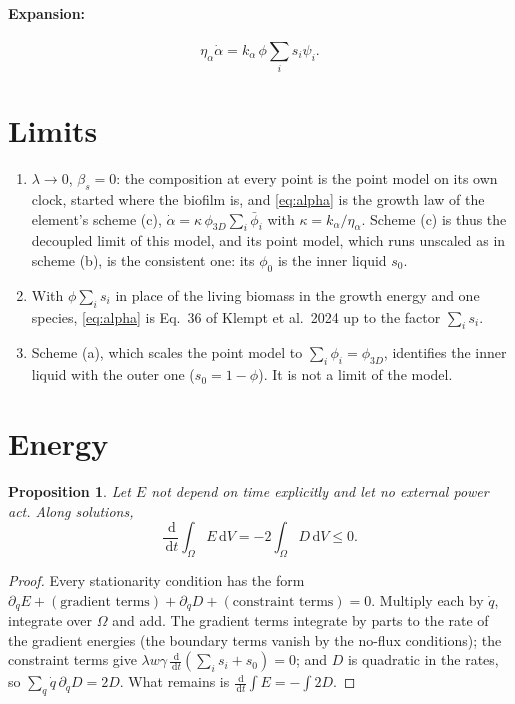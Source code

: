 \documentclass[11pt,a4paper]{article}
\newtheorem{proposition}{Proposition}
\newcommand{\dd}{\,\mathrm{d}}
\begin{document}
\paragraph{Expansion:}
\begin{equation}
\eta_\alpha\dot\alpha=k_\alpha\,\phi\sum_is_i\psi_i .
\label{eq:alpha}
\end{equation}

\section{Limits}

\begin{enumerate}
\item $\lambda\to0$, $\beta_s=0$: the composition at every point is the point model on
  its own clock, started where the biofilm is, and \eqref{eq:alpha} is the growth law of
  the element's scheme (c), $\dot\alpha=\kappa\,\phi_{3D}\sum_i\bar\phi_i$ with
  $\kappa=k_\alpha/\eta_\alpha$. Scheme (c) is thus the decoupled limit of this model,
  and its point model, which runs unscaled as in scheme (b), is the consistent one: its
  $\phi_0$ is the inner liquid $s_0$.
\item With $\phi\sum_is_i$ in place of the living biomass in the growth energy and one
  species, \eqref{eq:alpha} is Eq.~36 of Klempt et al.\ 2024 up to the factor $\sum_is_i$.
\item Scheme (a), which scales the point model to $\sum_i\phi_i=\phi_{3D}$, identifies
  the inner liquid with the outer one ($s_0=1-\phi$). It is not a limit of the model.
\end{enumerate}

\section{Energy}

\begin{proposition}
Let $E$ not depend on time explicitly and let no external power act. Along solutions,
\[\frac{\dd}{\dd t}\int_\Omega E\dd V=-2\int_\Omega D\dd V\le0 .\]
\end{proposition}
\begin{proof}
Every stationarity condition has the form $\partial_qE+(\text{gradient terms})
+\partial_{\dot q}D+(\text{constraint terms})=0$. Multiply each by $\dot q$, integrate
over $\Omega$ and add. The gradient terms integrate by parts to the rate of the gradient
energies (the boundary terms vanish by the no-flux conditions); the constraint terms give
$\lambda w\gamma\,\frac{\dd}{\dd t}(\sum_is_i+s_0)=0$; and $D$ is quadratic in the rates,
so $\sum_q\dot q\,\partial_{\dot q}D=2D$. What remains is
$\frac{\dd}{\dd t}\int E=-\int2D$.
\end{proof}
\end{document}
